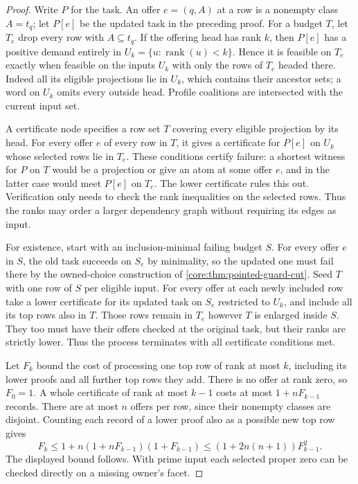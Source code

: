 \begin{proof}
Write $P$ for the task. An offer $e=(q,A)$ at a row is a nonempty
class $A=t_q$; let $P[e]$ be the updated task in the preceding proof.
For a budget $T$, let $T_e$ drop every row with $A\subseteq t_q$.
If the offering head has rank $k$, then $P[e]$ has a positive demand
entirely in $U_k=\{u:\operatorname{rank}(u)<k\}$. Hence it is feasible
on $T_e$ exactly when feasible on the inputs $U_k$ with only the
rows of $T_e$ headed there. Indeed all its eligible projections lie
in $U_k$, which contains their ancestor sets; a word on $U_k$
omits every outside head. Profile coalitions are intersected with
the current input set.

A certificate node specifies a row set $T$ covering every eligible
projection by its head. For every offer $e$ of every row in $T$,
it gives a certificate for $P[e]$ on $U_k$ whose selected rows lie
in $T_e$. These conditions certify failure: a shortest witness for
$P$ on $T$ would be a projection or give an atom at some offer $e$,
and in the latter case would meet $P[e]$ on $T_e$. The lower
certificate rules this out. Verification only needs to check the
rank inequalities on the selected rows. Thus the ranks may order a
larger dependency graph without requiring its edges as input.

For existence, start with an inclusion-minimal failing budget $S$.
For every offer $e$ in $S$, the old task succeeds on $S_e$ by
minimality, so the updated one must fail there by the owned-choice
construction of \cref{core:thm:pointed-guard-cut}. Seed $T$ with one
row of $S$ per eligible input. For every offer at each newly included
row take a lower certificate for its updated task on $S_e$ restricted
to $U_k$, and include all its top rows also in $T$. Those rows remain
in $T_e$ however $T$ is enlarged inside $S$. They too must have their
offers checked at the original task, but their ranks are strictly
lower. Thus the process terminates with all certificate conditions met.

Let $F_k$ bound the cost of processing one top row of rank at most
$k$, including its lower proofs and all further top rows they add.
There is no offer at rank zero, so $F_0=1$. A whole certificate of
rank at most $k-1$ costs at most $1+nF_{k-1}$ records. There are
at most $n$ offers per row, since their nonempty classes are disjoint.
Counting each record of a lower proof also as a possible new top row
gives
\[
 F_k\le 1+n(1+nF_{k-1})(1+F_{k-1})
       \le (1+2n(n+1))F_{k-1}^2 .
\]
The displayed bound follows. With prime input each selected proper
zero can be checked directly on a missing owner's facet.


\end{proof}
